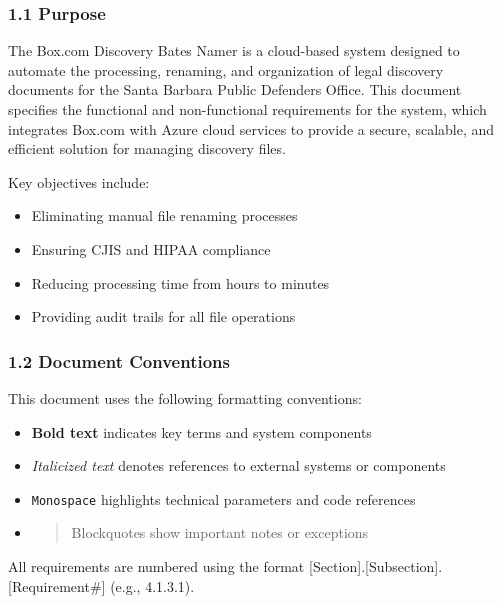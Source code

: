 \documentclass[
]{article}
\providecommand{\tightlist}{%
  \setlength{\itemsep}{0pt}\setlength{\parskip}{0pt}}
\begin{document}
\hypertarget{purpose}{%
\subsubsection{\texorpdfstring{\textbf{1.1
Purpose}}{1.1 Purpose}}\label{purpose}}

The Box.com Discovery Bates Namer is a cloud-based system designed to
automate the processing, renaming, and organization of legal discovery
documents for the Santa Barbara Public Defender\textquotesingle s
Office. This document specifies the functional and non-functional
requirements for the system, which integrates Box.com with Azure cloud
services to provide a secure, scalable, and efficient solution for
managing discovery files.

Key objectives include:

\begin{itemize}
\tightlist
\item
  Eliminating manual file renaming processes
\item
  Ensuring CJIS and HIPAA compliance
\item
  Reducing processing time from hours to minutes
\item
  Providing audit trails for all file operations
\end{itemize}

\hypertarget{document-conventions}{%
\subsubsection{\texorpdfstring{\textbf{1.2 Document
Conventions}}{1.2 Document Conventions}}\label{document-conventions}}

This document uses the following formatting conventions:

\begin{itemize}
\item
  \textbf{Bold text} indicates key terms and system components
\item
  \emph{Italicized text} denotes references to external systems or
  components
\item
  \texttt{Monospace} highlights technical parameters and code references
\item
  \begin{quote}
  Blockquotes show important notes or exceptions
  \end{quote}
\end{itemize}

All requirements are numbered using the format
{[}Section{]}.{[}Subsection{]}.{[}Requirement\#{]} (e.g., 4.1.3.1).
\end{document}
